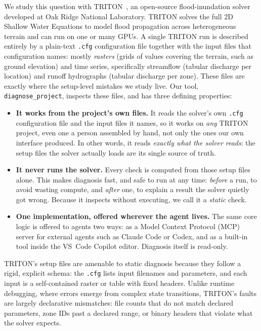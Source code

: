 \documentclass[conference]{IEEEtran}
\begin{document}
We study this question with TRITON~\cite{triton,tritondocs}, an open-source flood-inundation
solver developed at Oak Ridge National Laboratory. TRITON solves the full 2D Shallow Water
Equations to model flood propagation across heterogeneous terrain and can run on one or many
GPUs. A
single TRITON run is described entirely by a plain-text \texttt{.cfg} configuration file together
with the input files that configuration names: mostly \emph{rasters} (grids of values covering the
terrain, such as ground elevation) and time series, specifically streamflow (tabular discharge
per location) and runoff hydrographs (tabular discharge per zone). These files are
exactly where the setup-level mistakes we study live. Our tool, \texttt{diagnose\_project},
inspects these files, and has three defining properties:
\begin{itemize}
  \item \textbf{It works from the project's own files.} It reads the solver's own \texttt{.cfg}
        configuration file and the input files it names, so it works on \emph{any} TRITON
        project, even one a person assembled by hand, not only the ones our own interface produced.
        In other words, it reads \emph{exactly what the solver reads}: the setup files the solver
        actually loads are its single source of truth.
  \item \textbf{It never runs the solver.} Every check is computed from those setup files alone.
        This makes diagnosis fast, and safe to run at any time: \emph{before} a run,
        to avoid wasting compute, and \emph{after} one, to explain a result the solver quietly got
        wrong. Because it inspects without executing, we call it a \emph{static} check.
  \item \textbf{One implementation, offered wherever the agent lives.} The same core logic is
        offered to agents two ways: as a Model Context Protocol (MCP) server for external agents such as
        Claude Code or Codex, and as a built-in tool inside the VS~Code Copilot editor. Diagnosis
        itself is read-only.
\end{itemize}

TRITON's setup files are amenable to static diagnosis because they follow a rigid, explicit
schema: the \texttt{.cfg} lists input filenames and parameters, and each input is a self-contained
raster or table with fixed headers. Unlike runtime debugging, where errors emerge from complex
state transitions, TRITON's faults are largely declarative mismatches: file counts that do not
match declared parameters, zone IDs past a declared range, or binary headers that violate what the
solver expects.
\end{document}
